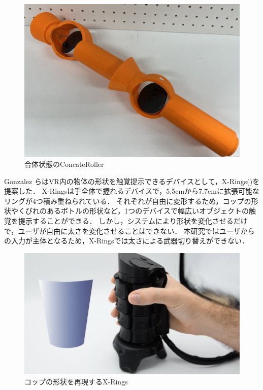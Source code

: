 \documentclass[uplatex]{jsarticle}
\begin{document}


\begin{figure}[htbp]
    \centering
    \includegraphics[width=0.9\linewidth]{fig/ConcateRoller合体.png}
    \caption{合体状態のConcateRoller}
    \label{fig:ConcateRoller_concate}
\end{figure}

Gonzalez らはVR内の物体の形状を触覚提示できるデバイスとして，X-Rings()を提案した\cite{gonzalez2021x-rings}．
X-Ringsは手全体で握れるデバイスで，5.5cmから7.7cmに拡張可能なリングが4つ積み重ねられている．
それぞれが自由に変形するため，コップの形状やくびれのあるボトルの形状など，1つのデバイスで幅広いオブジェクトの触覚を提示することができる．
しかし，システムにより形状を変化させるだけで，ユーザが自由に太さを変化させることはできない．
本研究ではユーザからの入力が主体となるため，X-Ringsでは太さによる武器切り替えができない．

\begin{figure}[htbp]
    \centering
    \includegraphics[width=0.9\linewidth]{fig/X-Rings.png}
    \caption{コップの形状を再現するX-Rings}
    \label{fig:X-Rings}
\end{figure}
\end{document}
